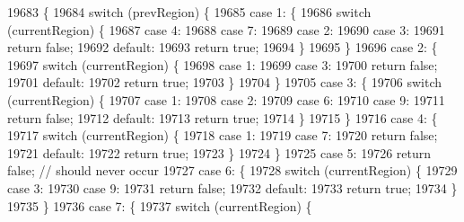 \begin{DoxyCode}
19683                                                                   \{
19684   \textcolor{keywordflow}{switch} (prevRegion) \{
19685   \textcolor{keywordflow}{case} 1: \{
19686     \textcolor{keywordflow}{switch} (currentRegion) \{
19687     \textcolor{keywordflow}{case} 4:
19688     \textcolor{keywordflow}{case} 7:
19689     \textcolor{keywordflow}{case} 2:
19690     \textcolor{keywordflow}{case} 3:
19691       \textcolor{keywordflow}{return} \textcolor{keyword}{false};
19692     \textcolor{keywordflow}{default}:
19693       \textcolor{keywordflow}{return} \textcolor{keyword}{true};
19694     \}
19695   \}
19696   \textcolor{keywordflow}{case} 2: \{
19697     \textcolor{keywordflow}{switch} (currentRegion) \{
19698     \textcolor{keywordflow}{case} 1:
19699     \textcolor{keywordflow}{case} 3:
19700       \textcolor{keywordflow}{return} \textcolor{keyword}{false};
19701     \textcolor{keywordflow}{default}:
19702       \textcolor{keywordflow}{return} \textcolor{keyword}{true};
19703     \}
19704   \}
19705   \textcolor{keywordflow}{case} 3: \{
19706     \textcolor{keywordflow}{switch} (currentRegion) \{
19707     \textcolor{keywordflow}{case} 1:
19708     \textcolor{keywordflow}{case} 2:
19709     \textcolor{keywordflow}{case} 6:
19710     \textcolor{keywordflow}{case} 9:
19711       \textcolor{keywordflow}{return} \textcolor{keyword}{false};
19712     \textcolor{keywordflow}{default}:
19713       \textcolor{keywordflow}{return} \textcolor{keyword}{true};
19714     \}
19715   \}
19716   \textcolor{keywordflow}{case} 4: \{
19717     \textcolor{keywordflow}{switch} (currentRegion) \{
19718     \textcolor{keywordflow}{case} 1:
19719     \textcolor{keywordflow}{case} 7:
19720       \textcolor{keywordflow}{return} \textcolor{keyword}{false};
19721     \textcolor{keywordflow}{default}:
19722       \textcolor{keywordflow}{return} \textcolor{keyword}{true};
19723     \}
19724   \}
19725   \textcolor{keywordflow}{case} 5:
19726     \textcolor{keywordflow}{return} \textcolor{keyword}{false}; \textcolor{comment}{// should never occur}
19727   \textcolor{keywordflow}{case} 6: \{
19728     \textcolor{keywordflow}{switch} (currentRegion) \{
19729     \textcolor{keywordflow}{case} 3:
19730     \textcolor{keywordflow}{case} 9:
19731       \textcolor{keywordflow}{return} \textcolor{keyword}{false};
19732     \textcolor{keywordflow}{default}:
19733       \textcolor{keywordflow}{return} \textcolor{keyword}{true};
19734     \}
19735   \}
19736   \textcolor{keywordflow}{case} 7: \{
19737     \textcolor{keywordflow}{switch} (currentRegion) \{

\end{DoxyCode}
